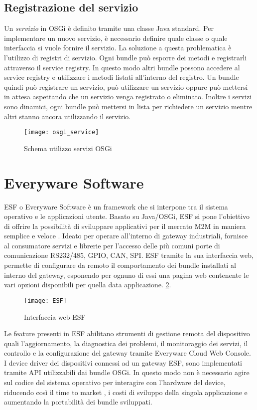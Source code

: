 \subsection{Registrazione del servizio}
Un \emph{servizio} in OSGi è definito tramite una classe Java standard. Per
implementare un nuovo servizio, è necessario definire quale classe o quale
interfaccia si vuole fornire il servizio.
La soluzione a questa problematica è l'utilizzo di registri di servizio. Ogni bundle può
esporre dei metodi e registrarli attraverso il service registry. In questo
modo altri bundle possono accedere al service registry e utilizzare i metodi
listati all'interno del registro. Un bundle quindi può registrare un servizio, può
utilizzare un servizio oppure può mettersi in attesa aspettando che un servizio
venga registrato o eliminato.
Inoltre i servizi sono dinamici, ogni bundle può mettersi in lista per
richiedere un servizio mentre altri stanno ancora utilizzando il servizio.
\begin{figure}[th]
        \centering 
                \texttt{[image: osgi\_service]}
        \caption{Schema utilizzo servizi OSGi}
        \label{}
\end{figure}

\section{Everyware Software}
ESF o Everyware Software è un framework che si interpone tra il sistema operativo
e le applicazioni utente. Basato su Java/OSGi, ESF si pone l'obiettivo di
offrire  la possibilità di sviluppare applicativi per il mercato M2M in maniera 
semplice e veloce . Ideato per operare all'interno di gateway
industriali, fornisce al consumatore servizi e librerie per l'accesso delle più
comuni porte di comunicazione RS232/485, GPIO, CAN, SPI.
ESF tramite la sua interfaccia web, permette di configurare da remoto il
comportamento dei bundle installati al interno del gateway, esponendo per ognuno
di essi una pagina web contenente le vari opzioni disponibili per quella data
applicazione.
\ref{fig:ESF_web}.


\begin{figure}[th]
        \centering 
                \texttt{[image: ESF]}
                \caption{Interfaccia web ESF}
        \label{fig:ESF_web}
\end{figure}
Le feature presenti in ESF abilitano strumenti di gestione remota del
dispositivo quali l'aggiornamento, la diagnostica dei problemi, il monitoraggio dei
 servizi, il  controllo e la configurazione del gateway tramite Everyware Cloud
Web Console.
I device driver dei dispositivi connessi ad un gateway ESF, sono implementati tramite
API utilizzabili dai bundle OSGi. In questo modo non è necessario agire sul
codice del sistema operativo per interagire con l'hardware del device, 
riducendo così il time to market , i costi di sviluppo della singola applicazione
e aumentando la portabilità dei bundle sviluppati.

